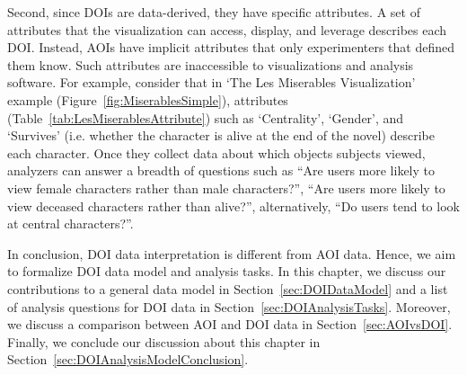 Second, since DOIs are data-derived, they have specific attributes. A set of attributes that the visualization can access, display, and leverage describes each DOI. Instead, AOIs have implicit attributes that only experimenters that defined them know. Such attributes are inaccessible to visualizations and analysis software. For example, consider that in `The Les Miserables Visualization' example (Figure~\ref{fig:MiserablesSimple}), attributes (Table~\ref{tab:LesMiserablesAttribute}) such as `Centrality', `Gender', and `Survives' (i.e. whether the character is alive at the end of the novel) describe each character. Once they collect data about which objects subjects viewed, analyzers can answer a breadth of questions such as ``Are users more likely to view female characters rather than male characters?'', ``Are users more likely to view deceased characters rather than alive?'', alternatively, ``Do users tend to look at central characters?''. 

In conclusion, DOI data interpretation is different from AOI data. Hence, we aim to formalize DOI data model and analysis tasks. In this chapter, we discuss our contributions to a general data model in Section~\ref{sec:DOIDataModel} and a list of analysis questions for DOI data in Section~\ref{sec:DOIAnalysisTasks}. Moreover, we discuss a comparison between AOI and DOI data in Section~\ref{sec:AOIvsDOI}. Finally, we conclude our discussion about this chapter in Section~\ref{sec:DOIAnalysisModelConclusion}.


